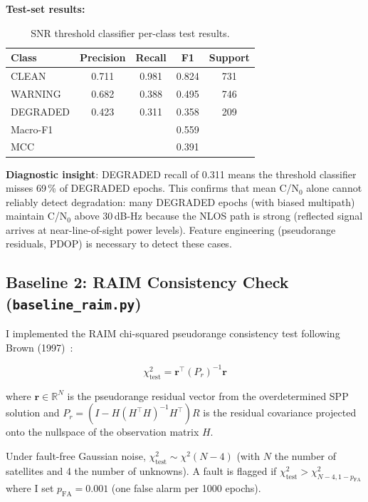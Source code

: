 \documentclass[12pt,a4paper]{article}
\begin{document}
\textbf{Test-set results:}
\begin{table}[H]
  \centering
  \caption{SNR threshold classifier per-class test results.}
  \begin{tabular}{lcccc}
    \toprule
    \textbf{Class} & \textbf{Precision} & \textbf{Recall} & \textbf{F1} & \textbf{Support} \\
    \midrule
    CLEAN    & 0.711 & 0.981 & 0.824 & 731 \\
    WARNING  & 0.682 & 0.388 & 0.495 & 746 \\
    DEGRADED & 0.423 & 0.311 & 0.358 & 209 \\
    \midrule
    Macro-F1 & & & 0.559 & \\
    MCC      & & & 0.391 & \\
    \bottomrule
  \end{tabular}
\end{table}

\textbf{Diagnostic insight}: DEGRADED recall of 0.311 means the threshold classifier
misses 69\,\% of DEGRADED epochs.
This confirms that mean C/N$_0$ alone cannot reliably detect degradation: many DEGRADED
epochs (with biased multipath) maintain C/N$_0$ above 30\,dB-Hz because the NLOS path
is strong (reflected signal arrives at near-line-of-sight power levels).
Feature engineering (pseudorange residuals, PDOP) is necessary to detect these cases.

\subsection{Baseline 2: RAIM Consistency Check (\texttt{baseline\_raim.py})}

I implemented the RAIM chi-squared pseudorange consistency test following Brown
(1997)~\cite{brown1997raim}:

\begin{equation}
  \chi^2_\mathrm{test} = \mathbf{r}^\top (P_r)^{-1} \mathbf{r}
\end{equation}

where $\mathbf{r} \in \mathbb{R}^N$ is the pseudorange residual vector from the
overdetermined SPP solution and $P_r = (I - H(H^\top H)^{-1}H^\top)R$ is the
residual covariance projected onto the nullspace of the observation matrix $H$.

Under fault-free Gaussian noise, $\chi^2_\mathrm{test} \sim \chi^2(N-4)$ (with $N$
the number of satellites and 4 the number of unknowns).
A fault is flagged if $\chi^2_\mathrm{test} > \chi^2_{N-4, 1-p_\mathrm{FA}}$ where
I set $p_\mathrm{FA} = 0.001$ (one false alarm per 1000 epochs).
\end{document}

